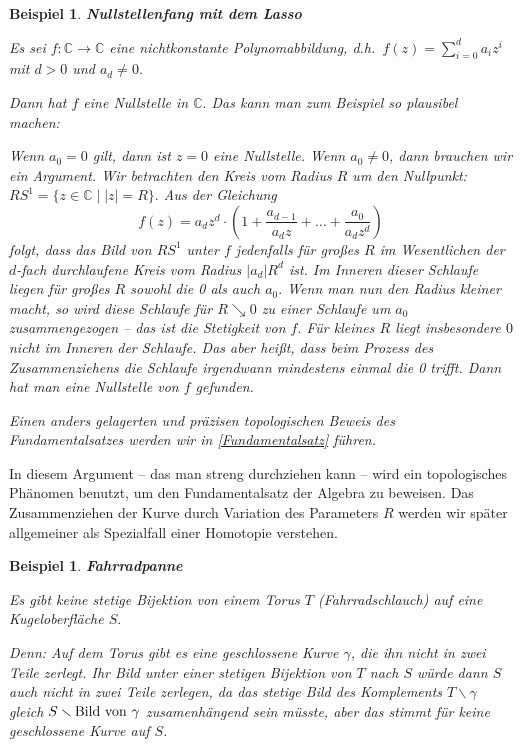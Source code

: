 \documentclass[12pt]{book}   %
\newtheorem{bsp}[alles]{Beispiel}
\begin{document}
\begin{bsp} \label{Lasso}{\bf Nullstellenfang mit dem Lasso}

{\rm Es sei $f:\mathbb C\longrightarrow \mathbb C$ eine nichtkonstante 
Polynomabbildung, d.h.\ $f(z) = \sum_{i=0}^d a_iz^i$ mit $d>0$ und $a_d\neq 0.$

Dann hat $f$ eine Nullstelle in $\mathbb C.$ Das kann man zum Beispiel so 
plausibel machen:

Wenn $a_0=0$ gilt, dann ist $z=0$ eine Nullstelle. Wenn $a_0\neq 0$, dann 
brauchen wir ein Argument. Wir betrachten den Kreis vom Radius $R$ um den 
Nullpunkt: $RS^1 = \{z\in \mathbb C \mid |z|=R\}.$ Aus der Gleichung
$$f(z) = a_dz^d \cdot (1 + \frac{a_{d-1}}{a_d z} + \dots + 
\frac{a_{0}}{a_d z^d})$$ 
folgt, dass das Bild von $RS^1$ unter $f$ jedenfalls f\"ur gro\ss es $R$ im 
Wesentlichen der $d$-fach 
durchlaufene Kreis vom Radius $|a_d|R^d$ ist. Im Inneren dieser Schlaufe liegen
f\"ur gro\ss es $R$ sowohl die 0 als auch $a_0.$ Wenn man nun den Radius 
kleiner macht, so wird diese Schlaufe f\"ur $R\searrow 0$ zu einer Schlaufe um 
$a_0$
zusammengezogen -- das ist die Stetigkeit von $f.$ F\"ur kleines $R$ liegt 
insbesondere $0$ nicht im Inneren der Schlaufe. Das aber hei\ss t, dass beim
Prozess des Zusammenziehens die Schlaufe irgendwann mindestens einmal die 0
trifft. Dann hat man eine Nullstelle von $f$ gefunden.

Einen anders gelagerten und pr\"azisen topologischen Beweis des 
Fundamentalsatzes werden wir in \ref{Fundamentalsatz} f\"uhren.
}
\end{bsp}

In diesem Argument -- das man streng durchziehen kann -- wird ein topologisches
Ph\"anomen benutzt, um den Fundamentalsatz der Algebra zu beweisen. Das 
Zusammenziehen der Kurve durch Variation des Parameters $R$ werden wir sp\"ater
allgemeiner als Spezialfall einer Homotopie verstehen.

\begin{bsp}{\bf Fahrradpanne}

{\rm Es gibt keine stetige Bijektion von einem Torus $T$ 
(\glqq Fahrradschlauch\grqq ) auf eine Kugeloberfl\"ache $S.$ 


Denn:  Auf dem Torus gibt es eine geschlossene Kurve $\gamma$, die ihn nicht 
in zwei 
Teile zerlegt. Ihr Bild unter einer stetigen Bijektion von $T$ nach $S$ 
w\"urde dann $S$ auch nicht in zwei Teile zerlegen, da das stetige Bild des
Komplements $T\smallsetminus \gamma$ gleich 
$S\smallsetminus{\rm Bild\ von\ }\gamma$ zusamenh\"angend sein m\"usste, aber
das stimmt f\"ur keine geschlossene Kurve auf $S$.}
\end{bsp}
\end{document}
